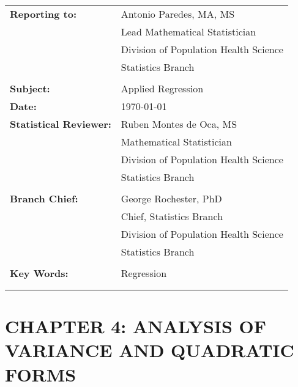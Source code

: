 \documentclass[letterpaper,11pt]{article}
\begin{document}
\begin{tabular}[h!]{p{2in} p{10in}}
	\rule{0pt}{4ex}\textbf{Reporting to:}          & Antonio Paredes, MA, MS  \\
																							   & Lead Mathematical Statistician \\
																							   & Division of Population Health Science \\
                                                 & Statistics Branch \\
																							   & \\
	\rule{0pt}{4ex}\textbf{Subject:}               & Applied Regression \\
	\rule{0pt}{4ex}\textbf{Date:}                  & \today \\
	\rule{0pt}{4ex}\textbf{Statistical Reviewer:}  & Ruben Montes de Oca, MS \\
																							   & Mathematical Statistician \\
																							   & Division of Population Health Science \\
                                                 & Statistics Branch \\
																							   & \\
	\rule{0pt}{4ex}\textbf{Branch Chief:}          & George Rochester, PhD \\
																							   & Chief, Statistics Branch \\
																							   & Division of Population Health Science \\
                                                 & Statistics Branch \\
                                                 & \\
	\rule{0pt}{4ex}\textbf{Key Words:}  					 & Regression \\
 \mbox{$\quad$} \\
 \mbox{$\quad$} \\
\end{tabular}

\newpage
\noindent 



\section*{CHAPTER 4: ANALYSIS OF VARIANCE AND QUADRATIC FORMS}
\end{document}
